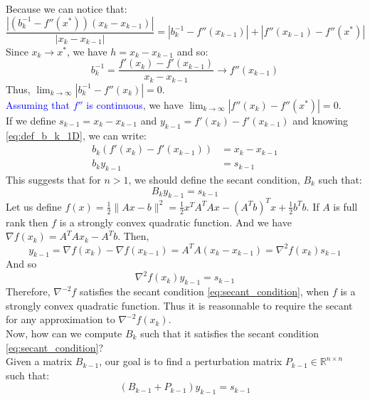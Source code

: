 \documentclass[12pt, openany]{report}
\newcommand{\R}{\mathbb{R}}
\theoremstyle{definition}
\begin{document}
Because we can notice that:
\begin{equation}
	\frac{|(b_k^{-1}-f''(x^*))(x_k-x_{k-1})|}{|x_k-x_{k-1}|} = |b_k^{-1}-f''(x_{k-1})|+|f''(x_{k-1})-f''(x^*)|
\end{equation}
Since $x_k \to x^*$, we have $h=x_k-x_{k-1}$ and so:
\begin{equation}
	b_k^{-1} = \frac{f'(x_k)-f'(x_{k-1})}{x_k-x_{k-1}} \to f''(x_{k-1})
\end{equation}
Thus, $\lim_{k \to \infty} |b_k^{-1} - f''(x_k)| = 0$.\\ 
\textcolor{blue}{Assuming that $f''$ is continuous}, we have $\lim_{k \to \infty} |f''(x_k) - f''(x^*)| = 0$.\\
If we define $s_{k-1} = x_k-x_{k-1}$ and $y_{k-1}=f'(x_k)-f'(x_{k-1})$ and knowing \eqref{eq:def_b_k_1D}, we can write:
\begin{equation}
	\begin{aligned}
		b_k (f'(x_k)-f'(x_{k-1})) &= x_k-x_{k-1}\\
		b_k y_{k-1} &= s_{k-1}
	\end{aligned}
\end{equation}
This suggests that for $n > 1$, we should define the secant condition, $B_k$ such that:
\begin{equation}\label{eq:secant_condition}
	B_k y_{k-1} = s_{k-1}
\end{equation}
Let us define $f(x) = \frac{1}{2} \|Ax-b\|^2 = \frac{1}{2} x^TA^TAx - (A^Tb)^Tx + \frac{1}{2} b^Tb$. If $A$ is full rank then $f$ is a strongly convex quadratic function. And we have $\nabla f(x_k) = A^TAx_k-A^Tb$. Then,
\begin{equation}
	y_{k-1} = \nabla f(x_k) - \nabla f(x_{k-1}) = A^TA(x_k-x_{k-1}) = \nabla^2 f(x_{k}) s_{k-1}
\end{equation} 
And so
\begin{equation}
	\nabla^2 f(x_k) y_{k-1} = s_{k-1}
\end{equation}
Therefore, $\nabla^{-2} f$ satisfies the secant condition \eqref{eq:secant_condition}, when $f$ is a strongly convex quadratic function. Thus it is reasonnable to require the secant for any approximation to $\nabla^{-2}f(x_k)$.\\
\newline
Now, how can we compute $B_k$ such that it satisfies the secant condition \eqref{eq:secant_condition}?\\
Given a matrix $B_{k-1}$, our goal is to find a perturbation matrix $P_{k-1} \in \R^{n \times n}$ such that:
\begin{equation}
	\left(B_{k-1} + P_{k-1}\right) y_{k-1} = s_{k-1}
\end{equation}
\end{document}
